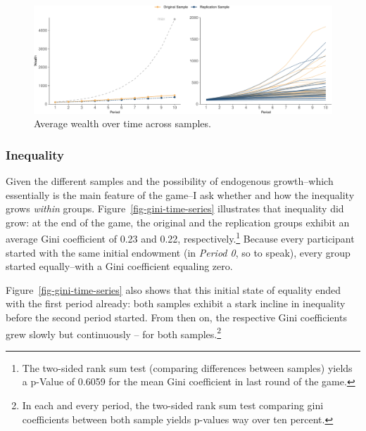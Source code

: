 \documentclass[
  authoryear,
  preprint,
  3p]{elsarticle}
\begin{document}
\begin{figure}

{\centering \includegraphics{paper_files/figure-pdf/fig-growth-heterogeneity-1.pdf}

}

\caption{\label{fig-growth-heterogeneity}Average wealth over time across
samples.}

\end{figure}

\hypertarget{sec-inequality}{%
\subsubsection{Inequality}\label{sec-inequality}}

Given the different samples and the possibility of endogenous
growth--which essentially is the main feature of the game--I ask whether
and how the inequality grows \emph{within} groups.
Figure~\ref{fig-gini-time-series} illustrates that inequality did grow:
at the end of the game, the original and the replication groups exhibit
an average Gini coefficient of 0.23 and 0.22, respectively.\footnote{The
  two-sided rank sum test (comparing differences between samples) yields
  a p-Value of 0.6059 for the mean Gini coefficient in last round of the
  game.} Because every participant started with the same initial
endowment (in \emph{Period 0}, so to speak), every group started
equally--with a Gini coefficient equaling zero.

Figure~\ref{fig-gini-time-series} also shows that this initial state of
equality ended with the first period already: both samples exhibit a
stark incline in inequality before the second period started. From then
on, the respective Gini coefficients grew slowly but continuously -- for
both samples.\footnote{In each and every period, the two-sided rank sum
  test comparing gini coefficients between both sample yields p-values
  way over ten percent.}
\end{document}
